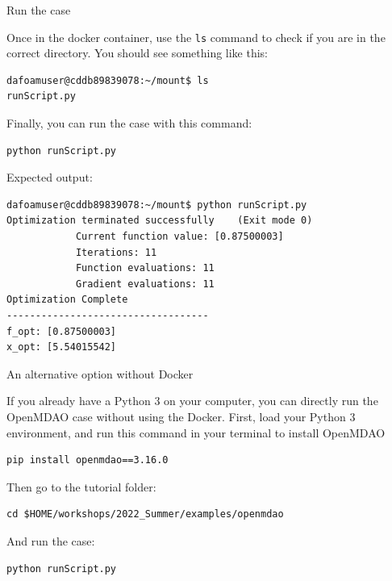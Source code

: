 \documentclass{bredelebeamer}
\begin{document}
\begin{frame}[fragile]{Run the case}

  Once in the docker container, use the \texttt{ls} command to check if you are in the correct directory. You should see something like this:

  \footnotesize
  \begin{lstlisting}
dafoamuser@cddb89839078:~/mount$ ls
runScript.py
  \end{lstlisting}
  \normalsize

  Finally, you can run the case with this command:

  \footnotesize
  \begin{lstlisting}
python runScript.py
  \end{lstlisting}
  \normalsize

  Expected output:

  \footnotesize
  \begin{lstlisting}
dafoamuser@cddb89839078:~/mount$ python runScript.py 
Optimization terminated successfully    (Exit mode 0)
            Current function value: [0.87500003]
            Iterations: 11
            Function evaluations: 11
            Gradient evaluations: 11
Optimization Complete
-----------------------------------
f_opt: [0.87500003]
x_opt: [5.54015542]
  \end{lstlisting}
  \normalsize

\end{frame}


\begin{frame}[fragile]{An alternative option without Docker}

If you already have a Python 3 on your computer, you can directly run the OpenMDAO case without using the Docker. First, load your Python 3 environment, and run this command in your terminal to install OpenMDAO
  \footnotesize
  \lstset{ language=bash }
  \begin{lstlisting}
pip install openmdao==3.16.0
  \end{lstlisting}
  \normalsize
     
  Then go to the tutorial folder:

  \footnotesize
  \begin{lstlisting}
cd $HOME/workshops/2022_Summer/examples/openmdao
  \end{lstlisting}
  \normalsize

  And run the case:

  \footnotesize
  \lstset{ language=bash }
  \begin{lstlisting}
python runScript.py
  \end{lstlisting}
  \normalsize

\end{frame}
\end{document}
